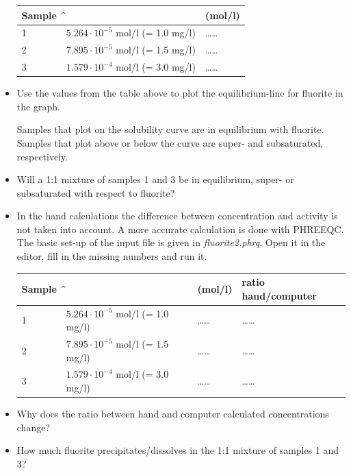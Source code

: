 \begin{itemize}
\begin{table}[h]
\centering
\footnotesize
\begin{tabular}{lll}
\toprule
Sample	& \f & \ca (mol/l) \\
\midrule
1 & $5.264 \cdot 10^{-5}$ mol/l (= 1.0 mg/l) & \ldots\ldots \\
2	& $7.895 \cdot 10^{-5}$ mol/l (= 1.5 mg/l) & \ldots\ldots \\
3	& $1.579 \cdot 10^{-4}$ mol/l (= 3.0 mg/l) & \ldots\ldots \\
\bottomrule
\end{tabular}
\end{table}

\item Use the values from the table above to plot the equilibrium-line for fluorite in the graph. 

Samples that plot on the solubility curve are in equilibrium with fluorite. Samples that plot above or below the curve are super- and subsaturated, respectively.

\item Will a 1:1 mixture of samples 1 and 3 be in equilibrium, super- or subsaturated with respect to fluorite?

\item In the hand calculations the difference between concentration and activity is not taken into account. A more accurate calculation is done with PHREEQC. The basic set-up of the input file is given in \textit{fluorite2.phrq}. Open it in the editor, fill in the missing numbers and run it.

\begin{table}[h]
\centering
\footnotesize
\begin{tabular}{llll}
\toprule
Sample	& \f & \ca (mol/l) & ratio hand/computer \\
\midrule
1 & $5.264 \cdot 10^{-5}$ mol/l (= 1.0 mg/l) & \ldots\ldots & \ldots\ldots \\
2	& $7.895 \cdot 10^{-5}$ mol/l (= 1.5 mg/l) & \ldots\ldots & \ldots\ldots \\
3	& $1.579 \cdot 10^{-4}$ mol/l (= 3.0 mg/l) & \ldots\ldots & \ldots\ldots \\
\bottomrule
\end{tabular}
\end{table}

\item Why does the ratio between hand and computer calculated concentrations change?

\item How much fluorite precipitates/dissolves in the 1:1 mixture of samples 1 and 3?

\end{itemize}
